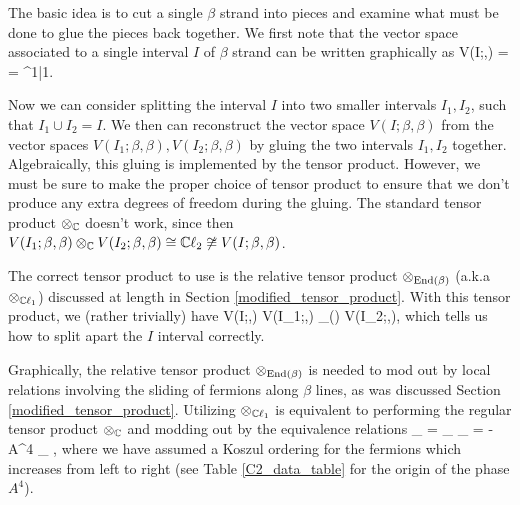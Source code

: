 The basic idea is to cut a single $\beta$ strand into pieces and examine what must be done to glue the 
pieces back together.
We first note that the vector space associated to a single interval $I$ of $\beta$ strand can be written graphically as 
 
\be\label{VIbetabeta}
 V(I;\beta,\beta) = \cc \left[ \halfchain\;, \; \halfchaindot \right] = \cc^{1|1}.\ee
 
 Now we can consider splitting the interval $I$ into two smaller intervals $I_1,I_2$, such that $I_1\cup I_2 = I$.
 We then can reconstruct the vector space $V(I;\beta,\beta)$ from the vector 
 spaces $V(I_1;\beta,\beta),V(I_2;\beta,\beta)$ by gluing the two intervals $I_1,I_2$ together. 
Algebraically, this gluing is implemented by the tensor product. However, 
we must be sure to make the proper choice 
of tensor product to ensure that we don't produce any extra degrees of freedom during the gluing. 
The standard tensor product $\otimes_{\mathbb{C}}$ doesn't work, since then $V(I_1;\beta,\beta) \otimes_{\mathbb{C}} V(I_2;\beta,\beta) \cong \mathbb{C}\ell_2 \not\cong V(I;\beta,\beta)$. 

The correct tensor product to use is the relative tensor product $\otimes_{\text{End}(\beta)}$ (a.k.a $\otimes_{\mathbb{C}\ell_1}$) discussed at length in Section \ref{modified_tensor_product}. 
With this tensor product, we (rather trivially) have 
\be V(I;\beta,\beta) \cong V(I_1;\beta,\beta) \tp_{\End(\beta)} V(I_2;\beta,\beta),\ee
which tells us how to split apart the $I$ interval correctly. 

Graphically, the relative tensor product $\otimes_{\text{End}(\beta)}$  is needed to mod out by local relations involving the sliding of fermions along $\beta$ lines, 
as was discussed Section \ref{modified_tensor_product}. 
Utilizing $\otimes_{\mathbb{C}\ell_1}$ is equivalent to performing the regular tensor product $\otimes_{\mathbb{C}}$ and modding out by the equivalence relations
\be
\label{graphical_equiv_reln} 
\halfchain \tp_\cc \halfchaindot \; =\; \halfchaindot \tp_\cc \halfchain\; \quad \quad {} \quad \quad 
\halfchaindot \tp_{\cc} \halfchaindot \;  = -A^4\; \halfchain \tp_{\cc}  \halfchain,
\ee 
where we have assumed a Koszul ordering for the fermions which increases from left to right (see Table \ref{C2_data_table} for the origin of the phase $A^4$).

